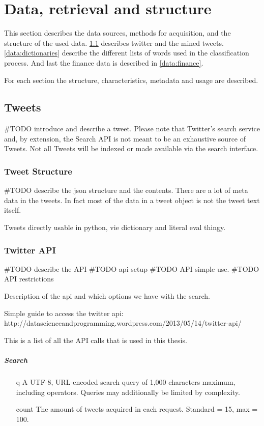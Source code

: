 \chapter{Data, retrieval and structure}

This section describes the data sources, methods for acquisition, and the
structure of the used data. \ref{data:tweets} describes twitter and the mined
tweets. \ref{data:dictionaries} describe the different lists of words used in
the classification process. And last the finance data is described in
\ref{data:finance}.

For each section the structure, characteristics, metadata and usage are
described. 
%

\section{Tweets}\label{data:tweets}
#TODO introduce and describe a tweet. 
Please note that Twitter's search service and, by extension, the Search API is
not meant to be an exhaustive source of Tweets. Not all Tweets will be indexed
or made available via the search interface. 
%

\subsection{Tweet Structure}
#TODO describe the json structure and the contents.
There are a lot of meta data in the tweets. In fact most of the data in a tweet
object is not the tweet text itself.

Tweets directly usable in python, vie dictionary and literal eval thingy. 
%

\subsection{Twitter API}
#TODO describe the API
#TODO api setup
#TODO API simple use.
#TODO API restrictions

Description of the api and which options we have with the search. 

Simple guide to access the twitter api:  http://datascienceandprogramming.wordpress.com/2013/05/14/twitter-api/

This is a list of all the API calls that is used in this thesis.
% 

\paragraph{Search} 
\begin{itemize}
\item[q] A UTF-8, URL-encoded search query of 1,000 characters maximum, including
operators. Queries may additionally be limited by complexity.

\item[count] The amount of tweets acquired in each request. Standard = 15, max
= 100. 

\end{itemize}
%

